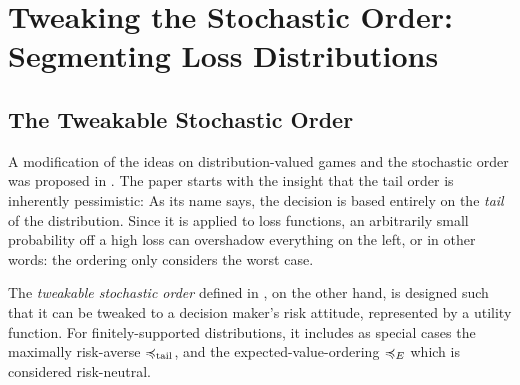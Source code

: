 \documentclass[a4paper]{scrreprt}
\theoremstyle{definition}
\begin{document}
    \chapter{Tweaking the Stochastic Order: Segmenting Loss Distributions}
    \newcommand{\Fab}{\mathfrak{F}_{[a, b]}} %
    
    \section{The Tweakable Stochastic Order}
    A modification of the ideas on distribution-valued games and the stochastic order was proposed in \cite{bib:tweakableStochasticOrders}.
    The paper starts with the insight that the tail order is inherently pessimistic: As its name says, the decision is based entirely on the \emph{tail} of the distribution. Since it is applied to loss functions, an arbitrarily small probability off a high loss can overshadow everything on the left, or in other words: the ordering only considers the worst case.
        
    The \emph{tweakable stochastic order} defined in \cite{bib:tweakableStochasticOrders}, on the other hand,
    is designed such that it can be tweaked to a decision maker's risk attitude, represented by a utility function.
    For finitely-supported distributions, it includes as special cases the maximally risk-averse $\preccurlyeq_{\text{tail}}$, and the expected-value-ordering $\preccurlyeq_E$ which is considered risk-neutral.
    
\end{document}
